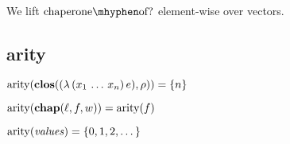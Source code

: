 
We lift $\mathrm{chaperone\mhyphen of?}$ element-wise over vectors.


\subsection{arity}

$\mathrm{arity}(\mathbf{clos}((\lambda\,(x_1\,\dots\,x_n)\,e),\rho))=\{n\}$

$\mathrm{arity}(\mathbf{chap}(\ell,f,w))=\mathrm{arity}(f)$

$\mathrm{arity}(\mathit{values})=\{0,1,2,\dots\}$

\newcommand{\funarr}[2]{$\mathbf{#1}\rightarrow\mathbf{#2}$}

